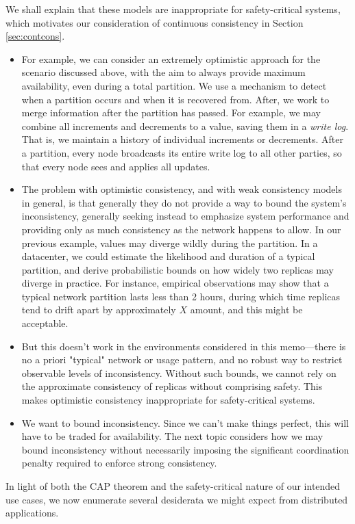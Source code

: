 We shall explain that these models are inappropriate for
safety-critical systems, which motivates our consideration of
continuous consistency in Section \ref{sec:contcons}.

\begin{itemize}
  \item For example, we can consider an extremely optimistic approach for
  the scenario discussed above, with the aim to always provide maximum
  availability, even during a total partition. We use a mechanism to
  detect when a partition occurs and when it is recovered from. After,
  we work to merge information after the partition has passed. For
  example, we may combine all increments and decrements to a value,
  saving them in a \emph{write log}. That is, we maintain a history of
  individual increments or decrements. After a partition, every node
  broadcasts its entire write log to all other parties, so that every
  node sees and applies all updates.

  \item The problem with optimistic consistency, and with weak consistency
  models in general, is that generally they do not provide a way to
  bound the system's inconsistency, generally seeking instead to
  emphasize system performance and providing only as much consistency
  as the network happens to allow. In our previous example, values may
  diverge wildly during the partition. In a datacenter, we could
  estimate the likelihood and duration of a typical partition, and
  derive probabilistic bounds on how widely two replicas may diverge
  in practice. For instance, empirical observations may show that a
  typical network partition lasts less than 2 hours, during which time
  replicas tend to drift apart by approximately $X$ amount, and this
  might be acceptable.

  \item But this doesn't work in the environments considered in this
  memo---there is no a priori "typical" network or usage pattern, and
  no robust way to restrict observable levels of
  inconsistency. Without such bounds, we cannot rely on the
  approximate consistency of replicas without comprising safety. This
  makes optimistic consistency inappropriate for safety-critical
  systems.

  \item We want to bound inconsistency. Since we can't make things perfect,
  this will have to be traded for availability. The next topic
  considers how we may bound inconsistency without necessarily
  imposing the significant coordination penalty required to enforce
  strong consistency.

\end{itemize}

In light of both the CAP theorem and the safety-critical nature of our
intended use cases, we now enumerate several desiderata we might
expect from distributed applications.
